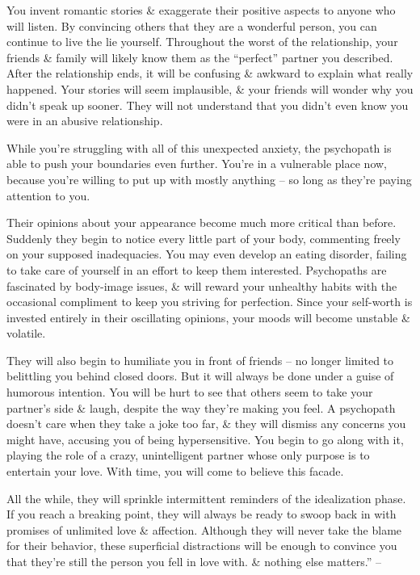 \documentclass{article}
\numberwithin{equation}{section}
\begin{document}
You invent romantic stories \& exaggerate their positive aspects to anyone who will listen. By convincing others that they are a wonderful person, you can continue to live the lie yourself. Throughout the worst of the relationship, your friends \& family will likely know them as the ``perfect'' partner you described. After the relationship ends, it will be confusing \& awkward to explain what really happened. Your stories will seem implausible, \& your friends will wonder why you didn't speak up sooner. They will not understand that you didn't even know you were in an abusive relationship.

While you're struggling with all of this unexpected anxiety, the psychopath is able to push your boundaries even further. You're in a vulnerable place now, because you're willing to put up with mostly anything -- so long as they're paying attention to you.

Their opinions about your appearance become much more critical than before. Suddenly they begin to notice every little part of your body, commenting freely on your supposed inadequacies. You may even develop an eating disorder, failing to take care of yourself in an effort to keep them interested. Psychopaths are fascinated by body-image issues, \& will reward your unhealthy habits with the occasional compliment to keep you striving for perfection. Since your self-worth is invested entirely in their oscillating opinions, your moods will become unstable \& volatile.

They will also begin to humiliate you in front of friends -- no longer limited to belittling you behind closed doors. But it will always be done under a guise of humorous intention. You will be hurt to see that others seem to take your partner's side \& laugh, despite the way they're making you feel. A psychopath doesn't care when they take a joke too far, \& they will dismiss any concerns you might have, accusing you of being hypersensitive. You begin to go along with it, playing the role of a crazy, unintelligent partner whose only purpose is to entertain your love. With time, you will come to believe this facade.

All the while, they will sprinkle intermittent reminders of the idealization phase. If you reach a breaking point, they will always be ready to swoop back in with promises of unlimited love \& affection. Although they will never take the blame for their behavior, these superficial distractions will be enough to convince you that they're still the person you fell in love with. \& nothing else matters.'' -- \cite[pp. 37--39]{MacKenzie2015}
\end{document}
